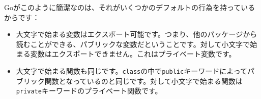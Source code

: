 Goがこのように簡潔なのは、それがいくつかのデフォルトの行為を持っているからです：

\begin{itemize}
  \item 大文字で始まる変数はエクスポート可能です。つまり、他のパッケージから読むことができる、パブリックな変数だということです。対して小文字で始まる変数はエクスポートできません。これはプライベート変数です。
  \item 大文字で始まる関数も同じです。\texttt{class}の中で\texttt{public}キーワードによってパブリック関数となっているのと同じです。対して小文字で始まる関数は\texttt{private}キーワードのプライベート関数です。
\end{itemize}

